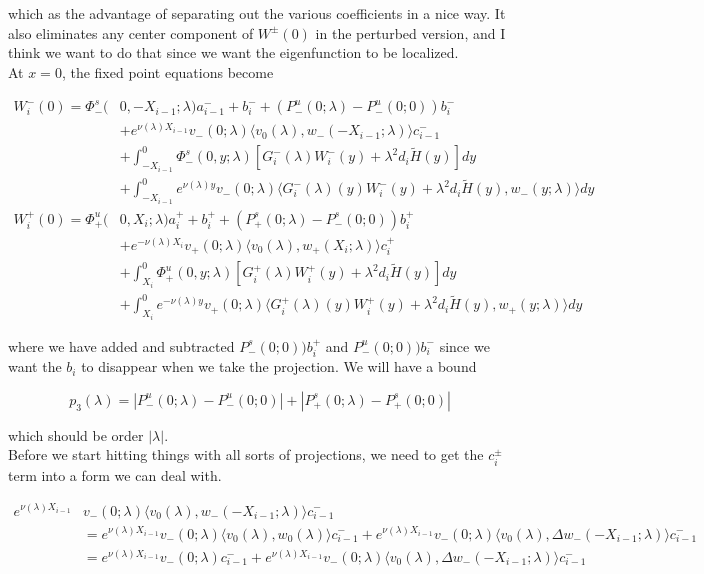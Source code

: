 \documentclass[12pt]{article}
\begin{document}
\begin{enumerate}
which as the advantage of separating out the various coefficients in a nice way. It also eliminates any center component of $W^\pm(0)$ in the perturbed version, and I think we want to do that since we want the eigenfunction to be localized.\\

At $x = 0$, the fixed point equations become

\begin{align*}
W_i^-(0) = \Phi^s_-(&0, -X_{i-1}; \lambda)a_{i-1}^- + b_i^- + (P^u_-(0; \lambda) - P^u_-(0; 0))b_i^- \\
&+ e^{\nu(\lambda)X_{i-1}} v_-(0; \lambda) \langle v_0(\lambda), w_-(-X_{i-1}; \lambda) \rangle c_{i-1}^- \\
&+ \int_{-X_{i-1}}^0 \Phi^s_-(0, y; \lambda) [ G_i^-(\lambda)W_i^-(y) + \lambda^2 d_i \tilde{H}(y) ] dy \\
&+ \int_{-X_{i-1}}^0
e^{\nu(\lambda)y} v_-(0; \lambda) \langle G_i^-(\lambda)(y)W_i^-(y) + \lambda^2 d_i \tilde{H}(y), w_-(y; \lambda) \rangle dy \\
W_i^+(0) = \Phi^u_+(&0, X_i; \lambda)a_i^+ + b_i^+ + (P^s_+(0; \lambda) - P^s_-(0; 0))b_i^+ \\
&+ e^{-\nu(\lambda) X_i} v_+(0; \lambda) \langle v_0(\lambda), w_+(X_i; \lambda) \rangle c_i^+ \\
&+ \int_{X_i}^0 \Phi^u_+(0, y; \lambda) [ G_i^+(\lambda)W_i^+(y) + \lambda^2 d_i \tilde{H}(y) ] dy \\
&+ \int_{X_i}^0 e^{-\nu(\lambda)y} v_+(0; \lambda) \langle G_i^+(\lambda)(y)W_i^+(y) + \lambda^2 d_i \tilde{H}(y), w_+(y; \lambda) \rangle dy
\end{align*}

where we have added and subtracted $P^s_-(0; 0))b_i^+$ and $P^u_-(0; 0))b_i^-$ since we want the $b_i$ to disappear when we take the projection. We will have a bound

\[
p_3(\lambda) = |P^u_-(0;\lambda) - P^u_-(0; 0)| + |P^s_+(0;\lambda) - P^s_+(0;0)|
\]

which should be order $|\lambda|$.\\

Before we start hitting things with all sorts of projections, we need to get the $c_i^\pm$ term into a form we can deal with. 

\begin{align*}
e^{\nu(\lambda)X_{i-1}} &v_-(0; \lambda) \langle v_0(\lambda), w_-(-X_{i-1}; \lambda) \rangle c_{i-1}^- \\
&= e^{\nu(\lambda)X_{i-1}} v_-(0; \lambda) \langle v_0(\lambda), w_0(\lambda) \rangle c_{i-1}^- + e^{\nu(\lambda)X_{i-1}} v_-(0; \lambda) \langle v_0(\lambda), \Delta w_-(-X_{i-1}; \lambda) \rangle c_{i-1}^- \\
&= e^{\nu(\lambda)X_{i-1}} v_-(0; \lambda) c_{i-1}^- + e^{\nu(\lambda)X_{i-1}} v_-(0; \lambda) \langle v_0(\lambda), \Delta w_-(-X_{i-1}; \lambda) \rangle c_{i-1}^-
\end{align*}


\end{enumerate}
\end{document}

